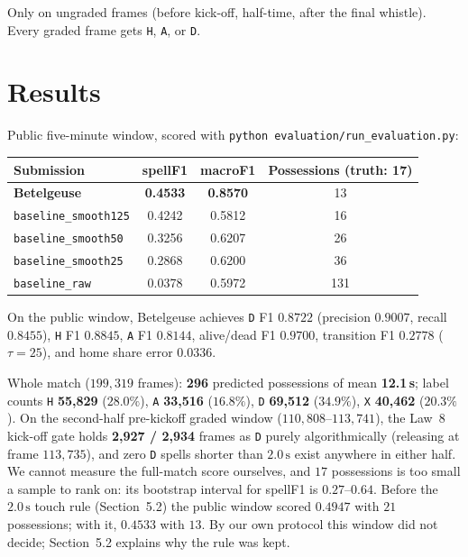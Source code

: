 \documentclass[11pt,a4paper]{article}
\newcommand{\code}[1]{\texttt{#1}}
\begin{document}
Only on ungraded frames (before kick-off, half-time, after the final whistle). Every graded frame
gets \code{H}, \code{A}, or \code{D}.

\section{Results}

Public five-minute window, scored with \code{python evaluation/run\_evaluation.py}:

\begin{center}
\begin{tabular}{@{}lccc@{}}
\toprule
\textbf{Submission} & \textbf{spellF1} & \textbf{macroF1} & \textbf{Possessions (truth: 17)} \\
\midrule
\textbf{Betelgeuse} & \textbf{0.4533} & \textbf{0.8570} & 13 \\
\code{baseline\_smooth125} & 0.4242 & 0.5812 & 16 \\
\code{baseline\_smooth50}  & 0.3256 & 0.6207 & 26 \\
\code{baseline\_smooth25}  & 0.2868 & 0.6200 & 36 \\
\code{baseline\_raw}       & 0.0378 & 0.5972 & 131 \\
\bottomrule
\end{tabular}
\end{center}

On the public window, Betelgeuse achieves \code{D} F1 $0.8722$ (precision $0.9007$, recall
$0.8455$), \code{H} F1 $0.8845$, \code{A} F1 $0.8144$, alive/dead F1 $0.9700$, transition F1
$0.2778$ ($\tau = 25$), and home share error $0.0336$.

Whole match ($199{,}319$ frames): \textbf{296} predicted possessions of mean \textbf{12.1\,s};
label counts \code{H} \textbf{55,829} ($28.0\%$), \code{A} \textbf{33,516} ($16.8\%$), \code{D} \textbf{69,512}
($34.9\%$), \code{X} \textbf{40,462} ($20.3\%$). On the second-half pre-kickoff graded window
($110{,}808$--$113{,}741$), the Law~8 kick-off gate holds \textbf{2,927 / 2,934} frames as \code{D}
purely algorithmically (releasing at frame $113{,}735$), and zero \code{D} spells shorter than
$2.0\,\text{s}$ exist anywhere in either half. We cannot measure the full-match score ourselves,
and $17$ possessions is too small a sample to rank on: its bootstrap interval for spellF1 is
$0.27$--$0.64$. Before the $2.0\,\text{s}$ touch rule (Section~5.2) the public window scored
$0.4947$ with $21$ possessions; with it, $0.4533$ with $13$. By our own protocol this window did
not decide; Section~5.2 explains why the rule was kept.
\end{document}
